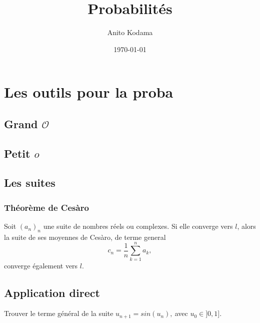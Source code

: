 

\title{Probabilités}
\author{Anito Kodama}
\date{\today}


\maketitle

\section{Les outils pour la proba}

\subsection{Grand $\mathcal{O}$}

\subsection{Petit $o$}

\subsection{Les suites}

\subsubsection{Théorème de Cesàro}
\bp
Soit $(a_n)_n$ une suite de nombres réels ou complexes. Si elle converge vers $l$, alors la suite de ses moyennes de Cesàro, de terme general $$c_n = \frac1n \sum_{k=1}^n a_k,$$ converge également vers $l$.
\ep

\bigskip
\subsection{Application direct}
\be
Trouver le terme général de la suite $u_{n+1} = sin(u_n), ~ $avec $u_0 \in ]0,1].$
\ee

